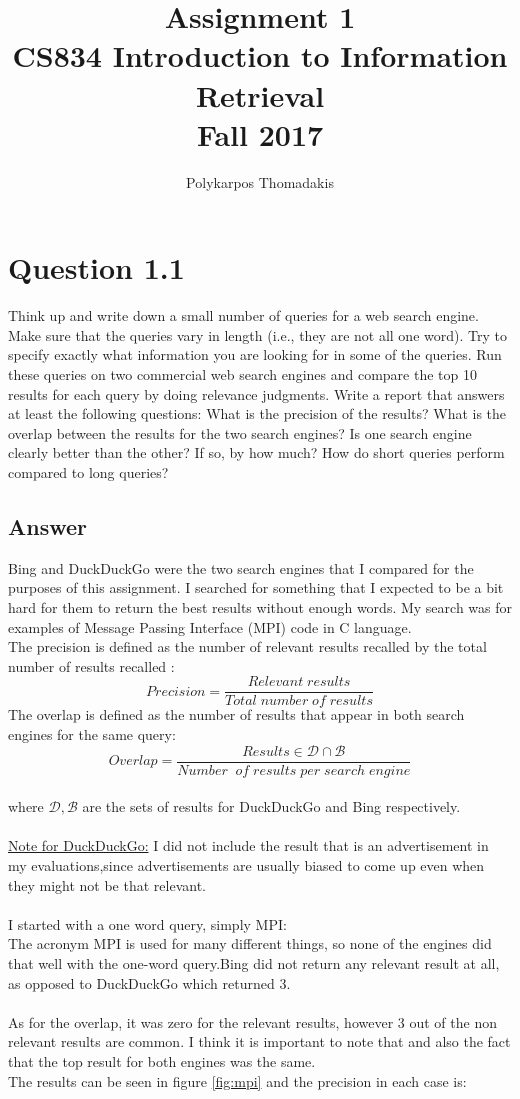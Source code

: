 \documentclass{article}
\author{Polykarpos Thomadakis}
\title{Assignment 1 \\
	\large CS834 Introduction to Information Retrieval\\Fall 2017}
\begin{document}
\maketitle
\section*{Question 1.1}
Think up and write down a small number of queries for a web search engine.
Make sure that the queries vary in length (i.e., they are not all one word). Try
to specify exactly what information you are looking for in some of the queries.
Run these queries on two commercial web search engines and compare the top
10 results for each query by doing relevance judgments. Write a report that answers
at least the following questions: What is the precision of the results? What
is the overlap between the results for the two search engines? Is one search engine
clearly better than the other? If so, by how much? How do short queries perform
compared to long queries?

\subsection*{Answer}
Bing and DuckDuckGo were the two search engines that I compared for the purposes of this assignment. I searched for something that I expected to be a bit hard for them to return the best results without enough words. My search was for examples of Message Passing Interface (MPI) code in C language. 
\\The precision is defined as the number of relevant results recalled by the total number of results recalled :
$$ Precision=\frac{Relevant\;results}{Total\;number\;of\;results} $$
The overlap is defined as the number of results that appear in both search engines for the same query:
$$ Overlap = \frac{Results \in  \mathcal{D\cap B}}{Number\;\;of\;results\;per\;search\;engine}$$\\
where $\mathcal{D,B}$ are the sets of results for DuckDuckGo and Bing respectively.\\
\\\underline{Note for DuckDuckGo:} I did not include the result that is an advertisement in my evaluations,since advertisements are usually biased to come up even when they might not be that relevant.\\
\\I started with a one word query, simply MPI:\\
The acronym MPI is used for many different things, so none of the engines did that well with the one-word query.Bing did not return any relevant result at all, as opposed to DuckDuckGo which returned 3.\\
\\As for the overlap, it was zero for the relevant results, however 3 out of the non relevant results are common. I think it is important to note that and also the fact that the top result for both engines was the same.\\
The results can be seen in figure \ref{fig:mpi} and the precision in each case is:
\end{document}
